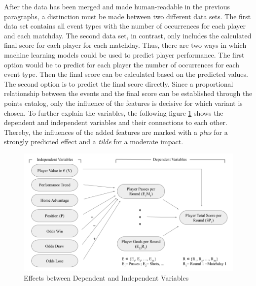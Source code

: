 After the data has been merged and made human-readable in the previous paragraphs, a distinction must be made between two different data sets. The first data set contains all event types with the number of occurrences for each player and each matchday. The second data set, in contrast, only includes the calculated final score for each player for each matchday. Thus, there are two ways in which machine learning models could be used to predict player performance. The first option would be to predict for each player the number of occurrences for each event type. Then the final score can be calculated based on the predicted values. The second option is to predict the final score directly. Since a proportional relationship between the events and the final score can be established through the points catalog, only the influence of the features is decisive for which variant is chosen. To further explain the variables, the following figure \ref{fig:dependent-independent} shows the dependent and independent variables and their connections to each other. Thereby, the influences of the added features are marked with a \emph{plus} for a strongly predicted effect and a \emph{tilde} for a moderate impact.

\begin{figure}[H]
    \centering
    \includegraphics[width=15cm]{chapter/4_implementation/section/2_data/section/figures/variables.png}
    \captionsetup{justification=centering}
    \caption{Effects between Dependent and Independent Variables}
    \label{fig:dependent-independent}
\end{figure}



